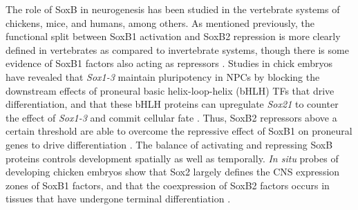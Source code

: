 \documentclass[withindex,glossary]{cam-thesis}
\begin{document}
The role of SoxB in neurogenesis has been studied in the vertebrate
systems of chickens, mice, and humans, among others. As mentioned
previously, the functional split between SoxB1 activation and SoxB2
repression is more clearly defined in vertebrates as compared to
invertebrate systems, though there is some evidence of SoxB1 factors
also acting as repressors . Studies in chick
embryos have revealed that \emph{Sox1-3} maintain pluripotency in NPCs
by blocking the downstream effects of proneural basic helix-loop-helix
(\gls{bHLH}) TFs that drive differentiation, and that these bHLH proteins can
upregulate \emph{Sox21} to counter the effect of \emph{Sox1-3} and
commit cellular fate . Thus,
SoxB2 repressors above a certain threshold are able to overcome the
repressive effect of SoxB1 on proneural genes to drive
differentiation . The balance of activating and
repressing SoxB proteins controls development spatially as well as
temporally. \emph{In situ} probes of developing chicken embryos show
that Sox2 largely defines the CNS expression zones of SoxB1 factors, and
that the coexpression of SoxB2 factors occurs in tissues that have
undergone terminal differentiation .
\end{document}

